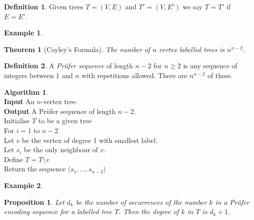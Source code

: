 \documentclass{article}
\newtheorem*{thm}{Theorem}
\newtheorem*{prop}{Proposition}
\theoremstyle{definition}
\newtheorem*{defn}{Definition}
\newtheorem*{ex}{Example}
\newtheorem*{alg}{Algorithm}
\begin{document}

\begin{defn}
Given trees $T=(V,E)$ and $T' = (V,E')$ we say $T=T'$ if $E = E'$.
\end{defn}

\begin{ex}
\end{ex}

\begin{thm}[Cayley's Formula]
The number of $n$ vertex labelled trees is $n^{n-2}$.
\end{thm}

\begin{defn}
A \emph{Pr\"ufer sequence} of length $n-2$ for $n\ge 2$ is any sequence of integers between 1 and $n$ with repetitions allowed.
There are $n^{n-2}$ of these.
\end{defn}

\begin{alg}~\\
\textbf{Input} An $n$-vertex tree.\\
\textbf{Output} A Pr\"ufer sequence of length $n-2$.\\
Initialise $T$ to be a given tree \\
For $i=1$ to $n-2$ \\
\indent Let $v$ be the vertex of degree 1 with smallest label.\\
\indent Let $s_i$ be the only neighbour of $v$.\\
\indent Define $T = T\setminus v$\\
Return the sequence $\langle s_1,\ldots,s_{n-2}\rangle$
\end{alg}

\begin{ex}
\end{ex}

\begin{prop}
Let $d_k$ be the number of occurrences of the number $k$ in a Pr\"ufer encoding sequence for a labelled tree $T$.
Then the degree of $k$ in $T$ is $d_k+1$.
\end{prop}
\end{document}
